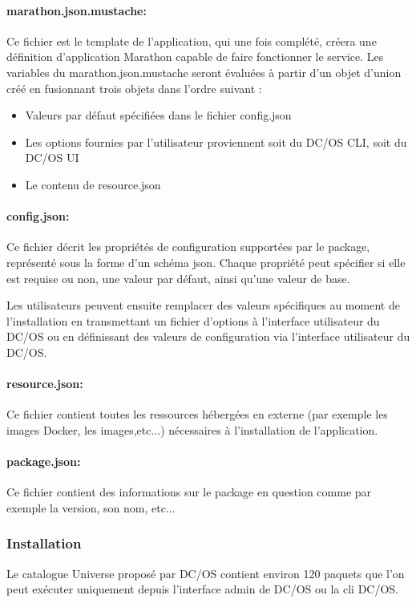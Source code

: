 \documentclass[11pt,fleqn]{book} %
\begin{document}
\paragraph{marathon.json.mustache:} Ce fichier est le template de l'application, qui une fois complété, créera une définition d'application Marathon capable de faire fonctionner le service. Les variables du marathon.json.mustache seront évaluées à partir d'un objet d'union créé en fusionnant trois objets dans l'ordre suivant :
\begin{itemize}
    \item Valeurs par défaut spécifiées dans le fichier config.json
    \item Les options fournies par l'utilisateur proviennent soit du DC/OS CLI, soit du DC/OS UI
    \item Le contenu de resource.json
\end{itemize}


\paragraph{config.json:} Ce fichier décrit les propriétés de configuration supportées par le package, représenté sous la forme d'un schéma json. Chaque propriété peut spécifier si elle est requise ou non, une valeur par défaut, ainsi qu'une valeur de base.

Les utilisateurs peuvent ensuite remplacer des valeurs spécifiques au moment de l'installation en transmettant un fichier d'options à l'interface utilisateur du DC/OS ou en définissant des valeurs de configuration via l'interface utilisateur du DC/OS.

\paragraph{resource.json:} Ce fichier contient toutes les ressources hébergées en externe (par exemple les images Docker, les images,etc...) nécessaires à l'installation de l'application.

\paragraph{package.json:} Ce fichier contient des informations sur le package en question comme par exemple la version, son nom, etc...\newline 

\subsubsection{Installation}
Le catalogue Universe proposé par DC/OS contient environ 120 paquets que l'on peut exécuter uniquement depuis l'interface admin de DC/OS ou la cli DC/OS.
\end{document}
